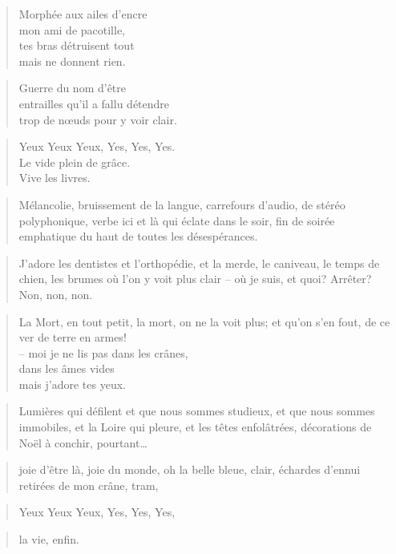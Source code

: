   \begin{verse}
    Morphée aux ailes d’encre\\
    mon ami de pacotille,\\
    tes bras détruisent tout\\
    mais ne donnent rien.
  \end{verse}
  \begin{verse}
    Guerre du nom d’être\\
    entrailles qu’il a fallu détendre\\
    trop de nœuds pour y voir clair.
  \end{verse}
  \begin{verse}
    Yeux Yeux Yeux, Yes, Yes, Yes.\\
    Le vide plein de grâce.\\
    Vive les livres.
  \end{verse}
  \begin{verse}
    Mélancolie, bruissement de la langue, carrefours d’audio, de stéréo polyphonique,
    verbe ici et là qui éclate dans le soir, fin de soirée emphatique du haut de toutes
    les désespérances.
  \end{verse}
  \begin{verse}
    J’adore les dentistes et l’orthopédie, et la merde, le caniveau, le temps de chien,
    les brumes où l’on y voit plus clair -- où je suis, et quoi? Arrêter? Non, non, non.
  \end{verse}
  \begin{verse}
    La Mort, en tout petit, {\tiny la mort}, on ne la voit plus; et qu’on s’en fout, de ce ver de
    terre en armes!\\
    -- moi je ne lis pas dans les crânes,\\
    dans les âmes vides\\
    mais j’adore tes yeux.
  \end{verse}
  \begin{verse}
    Lumières qui défilent et que nous sommes studieux, et que nous sommes immobiles, et la
    Loire qui pleure, et les têtes enfolâtrées, décorations de Noël à conchir, pourtant…
  \end{verse}
  \begin{verse}
    joie d’être là, joie du monde, oh la belle bleue, clair, échardes d’ennui retirées de mon
    crâne, tram,
  \end{verse}
  \begin{verse}
    Yeux Yeux Yeux, Yes, Yes, Yes,
  \end{verse}
  \begin{verse}
    la vie, enfin.
  \end{verse}
